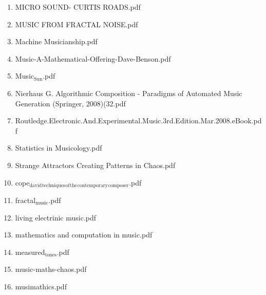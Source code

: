 \documentclass[11pt]{article}
\begin{document}
\begin{enumerate}
\item MICRO SOUND- CURTIS ROADS.pdf
\label{sec-1-1-1-1-11-19-25-16}

\item MUSIC FROM FRACTAL NOISE.pdf
\label{sec-1-1-1-1-11-19-25-17}

\item Machine Musicianship.pdf
\label{sec-1-1-1-1-11-19-25-18}

\item Music-A-Mathematical-Offering-Dave-Benson.pdf
\label{sec-1-1-1-1-11-19-25-19}

\item Music$_{\text{Sun}}$.pdf
\label{sec-1-1-1-1-11-19-25-20}

\item Nierhaus G. Algorithmic Composition - Paradigms of Automated Music Generation (Springer, 2008)(32.pdf
\label{sec-1-1-1-1-11-19-25-21}

\item Routledge.Electronic.And.Experimental.Music.3rd.Edition.Mar.2008.eBook.pdf
\label{sec-1-1-1-1-11-19-25-22}

\item Statistics in Musicology.pdf
\label{sec-1-1-1-1-11-19-25-23}

\item Strange Attractors Creating Patterns in Chaos.pdf
\label{sec-1-1-1-1-11-19-25-24}

\item cope$_{\text{david}}$$_{\text{techniques}}$$_{\text{of}}$$_{\text{the}}$$_{\text{contemporary}}$$_{\text{composer}}$.pdf
\label{sec-1-1-1-1-11-19-25-25}

\item fractal$_{\text{music}}$.pdf
\label{sec-1-1-1-1-11-19-25-26}

\item living electrinic music.pdf
\label{sec-1-1-1-1-11-19-25-27}

\item mathematics and computation in music.pdf
\label{sec-1-1-1-1-11-19-25-28}

\item measured$_{\text{tones}}$.pdf
\label{sec-1-1-1-1-11-19-25-29}

\item music-maths-chaos.pdf
\label{sec-1-1-1-1-11-19-25-30}

\item musimathics.pdf
\label{sec-1-1-1-1-11-19-25-31}


\end{enumerate}
\end{document}
